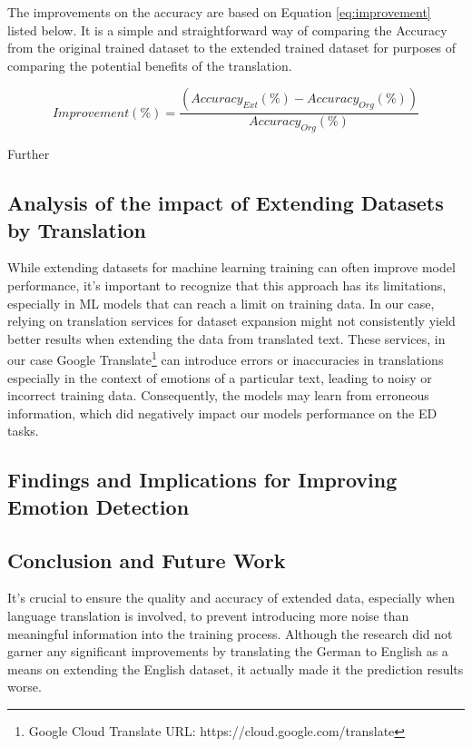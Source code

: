 \documentclass[11pt]{article}
\begin{document}
The improvements on the accuracy are based on Equation \eqref{eq:improvement} listed below. It is a simple and straightforward way of comparing the Accuracy from the original trained dataset to the extended trained dataset for purposes of comparing the potential benefits of the translation.

\begin{equation}
Improvement(\%) = \dfrac{(Accuracy_{Ext} (\%) - Accuracy_{Org} (\%))}{Accuracy_{Org}(\%)}
\label{eq:improvement}
\end{equation}

Further

\subsection{Analysis of the impact of Extending Datasets by Translation}
While extending datasets for machine learning training can often improve\cite{Sarker2021} model performance, it's important to recognize that this approach has its limitations, especially in ML models that can reach a limit on training data. In our case, relying on translation services for dataset expansion might not consistently yield better results when extending the data from translated text. These services, in our case Google Translate\footnote{Google Cloud Translate URL: https://cloud.google.com/translate} can introduce errors or inaccuracies in translations especially in the context of emotions of a particular text, leading to noisy or incorrect training data. Consequently, the models may learn from erroneous information, which did negatively impact our models performance on the ED tasks.

\subsection{Findings and Implications for Improving Emotion Detection}


\subsection{Conclusion and Future Work}
It's crucial to ensure the quality and accuracy of extended data, especially when language translation is involved, to prevent introducing more noise than meaningful information into the training process. Although the research did not garner any significant improvements by translating the German to English as a means on extending the English dataset, it actually made it the prediction results worse.
\end{document}
